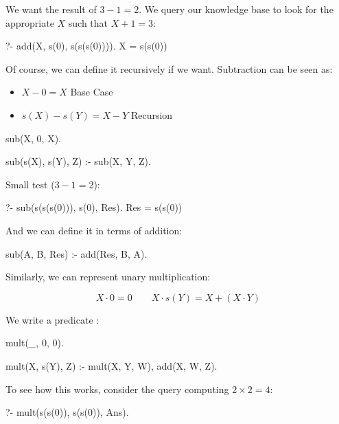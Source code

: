 \begin{example}{}
We want the result of $3-1=2$. We query our knowledge base to look for the appropriate $X$ such that $X+1=3$:

\begin{codeblock}
?- add(X, s(0), s(s(s(0)))).
X = s(s(0))
\end{codeblock}
\end{example}

Of course, we can define it recursively if we want. Subtraction can be seen as:

\begin{itemize}
    \item $X - 0 = X$ \hfill{Base Case}
    \item $s(X) - s(Y) = X-Y$ \hfill{Recursion}
\end{itemize}

\begin{codeblock}
sub(X, 0, X).

sub(s(X), s(Y), Z) :-
    sub(X, Y, Z).
\end{codeblock}

Small test ($3-1=2$):
\begin{codeblock}
?- sub(s(s(s(0))), s(0), Res).
Res = s(s(0))
\end{codeblock}

And we can define it in terms of addition:

\begin{codeblock}
sub(A, B, Res) :- add(Res, B, A).
\end{codeblock}


Similarly, we can represent unary multiplication:

\[
X \cdot 0 = 0 \qquad X \cdot s(Y) = X + (X \cdot Y)
\]


We write a predicate :

\begin{codeblock}
mult(_, 0, 0).

mult(X, s(Y), Z) :-
    mult(X, Y, W),
    add(X, W, Z).
\end{codeblock}

To see how this works, consider the query computing $2 \times 2 = 4$:
\begin{codeblock}
?- mult(s(s(0)), s(s(0)), Ans).
\end{codeblock}

